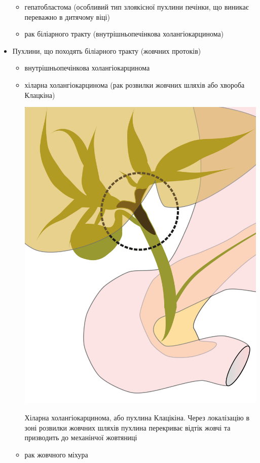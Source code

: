 \begin{itemize}
\begin{itemize}
            \item гепатобластома (особливий тип злоякісної пухлини печінки, що виникає переважно в дитячому віці)
            \item рак біліарного тракту (внутрішньопечінкова холангіокарцинома)
        \end{itemize}
    \item Пухлини, що походять біліарного тракту (жовчних протоків) 
        \begin{itemize}
            \item внутрішньопечінкова холангіокарцинома
            \item хіларна холангіокарцинома (рак розвилки жовчних шляхів або хвороба Клацкіна)
            \begin{marginfigure}[10pt]%
                \includegraphics[width=\linewidth]{Figures/PHCC.png}
                \caption{Хіларна холангіокарцинома, або пухлина Клацікіна. Через локалізацію в зоні розвилки жовчних шляхів пухлина перекриває відтік жовчі та призводить до механінчої жовтяниці}
                 \label{fig:phcc}
            \end{marginfigure}
            
            \item рак жовчного міхура
        \end{itemize}
\end{itemize}
	
